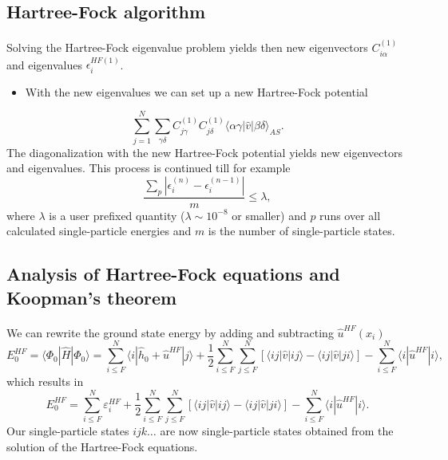 \documentclass[%
twoside,                 %
final,                   %
10pt]{article}
\begin{document}
\subsection*{Hartree-Fock algorithm}

\paragraph{}
Solving the Hartree-Fock eigenvalue problem yields then new eigenvectors $C_{i\alpha}^{(1)}$ and eigenvalues
$\epsilon_i^{HF(1)}$. 
\begin{itemize}
 \item With the new eigenvalues we can set up a new Hartree-Fock potential 
\end{itemize}

\noindent
\[
\sum_{j = 1}^N\sum_{\gamma\delta} C_{j\gamma}^{(1)}C_{j\delta}^{(1)}\langle \alpha\gamma|\hat{v}|\beta\delta\rangle_{AS}.
\]
The diagonalization with the new Hartree-Fock potential yields new eigenvectors and eigenvalues.
This process is continued till for example
\[
\frac{\sum_{p} |\epsilon_i^{(n)}-\epsilon_i^{(n-1)}|}{m} \le \lambda,  
\]
where $\lambda$ is a user prefixed quantity ($\lambda \sim 10^{-8}$ or smaller) and $p$ runs over all calculated single-particle
energies and $m$ is the number of single-particle states.



\subsection*{Analysis of Hartree-Fock equations and Koopman's theorem}

\paragraph{}
We can rewrite the ground state energy by adding and subtracting $\hat{u}^{HF}(x_i)$ 
\[
  E_0^{HF} =\langle \Phi_0 | \hat{H} | \Phi_0\rangle = 
\sum_{i\le F}^N \langle i | \hat{h}_0 +\hat{u}^{HF}| j\rangle+ \frac{1}{2}\sum_{i\le F}^N\sum_{j \le F}^N\left[\langle ij |\hat{v}|ij \rangle-\langle ij|\hat{v}|ji\rangle\right]-\sum_{i\le F}^N \langle i |\hat{u}^{HF}| i\rangle,
\]
which results in
\[
  E_0^{HF}
  = \sum_{i\le F}^N \varepsilon_i^{HF} + \frac{1}{2}\sum_{i\le F}^N\sum_{j \le F}^N\left[\langle ij |\hat{v}|ij \rangle-\langle ij|\hat{v}|ji\rangle\right]-\sum_{i\le F}^N \langle i |\hat{u}^{HF}| i\rangle.
\]
Our single-particle states $ijk\dots$ are now single-particle states obtained from the solution of the Hartree-Fock equations.
\end{document}

